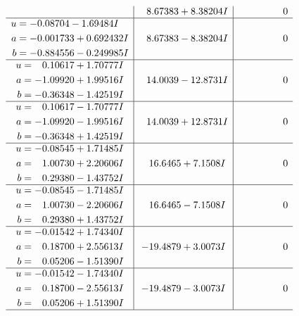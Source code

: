 \documentclass[1p]{elsarticle_modified}
\theoremstyle{definition}
\begin{document}
$$\begin{array}{c|c|c}
 & \phantom{-}8.67383 + 8.38204 I & \phantom{-0.000000 } 0 \\ \hline\begin{aligned}
u &= -0.08704 - 1.69484 I \\
a &= -0.001733 + 0.692432 I \\
b &= -0.884556 - 0.249985 I\end{aligned}
 & \phantom{-}8.67383 - 8.38204 I & \phantom{-0.000000 } 0 \\ \hline\begin{aligned}
u &= \phantom{-}0.10617 + 1.70777 I \\
a &= -1.09920 + 1.99516 I \\
b &= -0.36348 - 1.42519 I\end{aligned}
 & \phantom{-}14.0039 - 12.8731 I & \phantom{-0.000000 } 0 \\ \hline\begin{aligned}
u &= \phantom{-}0.10617 - 1.70777 I \\
a &= -1.09920 - 1.99516 I \\
b &= -0.36348 + 1.42519 I\end{aligned}
 & \phantom{-}14.0039 + 12.8731 I & \phantom{-0.000000 } 0 \\ \hline\begin{aligned}
u &= -0.08545 + 1.71485 I \\
a &= \phantom{-}1.00730 + 2.20606 I \\
b &= \phantom{-}0.29380 - 1.43752 I\end{aligned}
 & \phantom{-}16.6465 + 7.1508 I & \phantom{-0.000000 } 0 \\ \hline\begin{aligned}
u &= -0.08545 - 1.71485 I \\
a &= \phantom{-}1.00730 - 2.20606 I \\
b &= \phantom{-}0.29380 + 1.43752 I\end{aligned}
 & \phantom{-}16.6465 - 7.1508 I & \phantom{-0.000000 } 0 \\ \hline\begin{aligned}
u &= -0.01542 + 1.74340 I \\
a &= \phantom{-}0.18700 + 2.55613 I \\
b &= \phantom{-}0.05206 - 1.51390 I\end{aligned}
 & -19.4879 + 3.0073 I & \phantom{-0.000000 } 0 \\ \hline\begin{aligned}
u &= -0.01542 - 1.74340 I \\
a &= \phantom{-}0.18700 - 2.55613 I \\
b &= \phantom{-}0.05206 + 1.51390 I\end{aligned}
 & -19.4879 - 3.0073 I & \phantom{-0.000000 } 0\\
 \hline 
 \end{array}$$\newpage\newpage\renewcommand{\arraystretch}{1}
\end{document}
